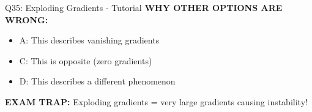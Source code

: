 \documentclass[8pt]{beamer}
\begin{document}
\begin{frame}{Q35: Exploding Gradients - Tutorial}
		\vspace{0.05cm}
		\textcolor{myred}{\textbf{WHY OTHER OPTIONS ARE WRONG:}}
		\begin{itemize}
			\item \textcolor{myred}{A:} This describes vanishing gradients
			\item \textcolor{myred}{C:} This is opposite (zero gradients)
			\item \textcolor{myred}{D:} This describes a different phenomenon
		\end{itemize}
		
		\textcolor{myred}{\textbf{EXAM TRAP:}} Exploding gradients = \textcolor{myblue}{very large gradients} causing instability!
	\end{frame}
	
	
\end{document}
